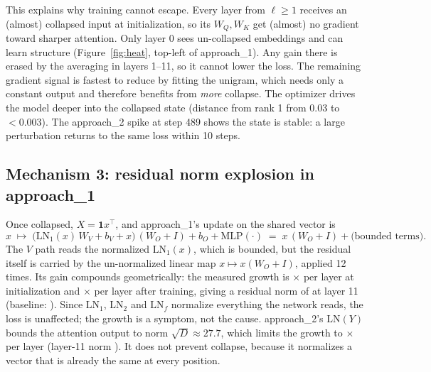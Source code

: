 \documentclass[11pt]{article}
\begin{document}
This explains why training cannot escape. Every layer from $\ell\ge 1$ receives an (almost) collapsed
input at initialization, so its $W_Q, W_K$ get (almost) no gradient toward sharper attention. Only
layer 0 sees un-collapsed embeddings and can learn structure (Figure~\ref{fig:heat}, top-left of
approach\_1). Any gain there is erased by the averaging in layers 1--11, so it cannot lower the loss.
The remaining gradient signal is fastest to reduce by fitting the unigram, which needs only a constant
output and therefore benefits from \emph{more} collapse. The optimizer drives the model deeper into the
collapsed state (distance from rank 1 from 0.03 to $<0.003$). The approach\_2 spike at step 489 shows the
state is stable: a large perturbation returns to the same loss within 10 steps.

\subsection{Mechanism 3: residual norm explosion in approach\_1}\label{sec:norm}
Once collapsed, $X = \mathbf 1 x^\top$, and approach\_1's update on the shared vector is
\[
x \;\mapsto\; \big(\mathrm{LN}_1(x)\,W_V + b_V + x\big)\,(W_O + I) + b_O + \mathrm{MLP}(\cdot)
\;=\; x\,(W_O + I) + \text{(bounded terms)}.
\]
The $V$ path reads the normalized $\mathrm{LN}_1(x)$, which is bounded, but the residual itself is carried by
the un-normalized linear map $x\mapsto x(W_O+I)$, applied 12 times. Its gain compounds geometrically:
the measured growth is \OneGrowthInit$\times$ per layer at initialization and \OneGrowth$\times$ per layer after
training, giving a residual norm of \OneNormEnd{} at layer 11 (baseline: \BaseNormEnd). Since $\mathrm{LN}_1$,
$\mathrm{LN}_2$ and $\mathrm{LN}_f$ normalize everything the network reads, the loss is unaffected; the
growth is a symptom, not the cause. approach\_2's $\mathrm{LN}(Y)$ bounds the attention output to norm
$\sqrt D\approx 27.7$, which limits the growth to \TwoGrowth$\times$ per layer (layer-11 norm \TwoNormEnd). It does not
prevent collapse, because it normalizes a vector that is already the same at every position.
\end{document}

